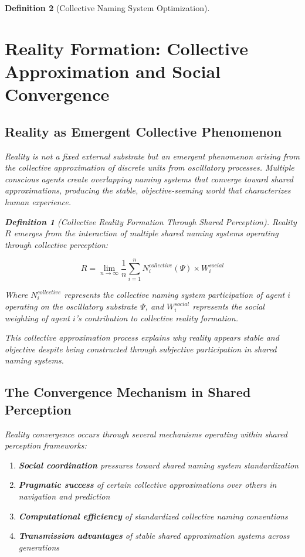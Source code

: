 \documentclass[12pt]{article}
\newtheorem{definition}{Definition}
\begin{document}
\begin{definition}[Collective Naming System Optimization]
\section{Reality Formation: Collective Approximation and Social Convergence}

\subsection{Reality as Emergent Collective Phenomenon}

Reality is not a fixed external substrate but an emergent phenomenon arising from the collective approximation of discrete units from oscillatory processes. Multiple conscious agents create overlapping naming systems that converge toward shared approximations, producing the stable, objective-seeming world that characterizes human experience.

\begin{definition}[Collective Reality Formation Through Shared Perception]
Reality $R$ emerges from the interaction of multiple shared naming systems operating through collective perception:

$$R = \lim_{n \to \infty} \frac{1}{n} \sum_{i=1}^{n} N_i^{collective}(\Psi) \times W_i^{social}$$

Where $N_i^{collective}$ represents the collective naming system participation of agent $i$ operating on the oscillatory substrate $\Psi$, and $W_i^{social}$ represents the social weighting of agent $i$'s contribution to collective reality formation.
\end{definition}

This collective approximation process explains why reality appears stable and objective despite being constructed through subjective participation in shared naming systems.

\subsection{The Convergence Mechanism in Shared Perception}

Reality convergence occurs through several mechanisms operating within shared perception frameworks:

\begin{enumerate}
\item \textbf{Social coordination} pressures toward shared naming system standardization
\item \textbf{Pragmatic success} of certain collective approximations over others in navigation and prediction
\item \textbf{Computational efficiency} of standardized collective naming conventions
\item \textbf{Transmission advantages} of stable shared approximation systems across generations
\end{enumerate}


\end{definition}
\end{document}
